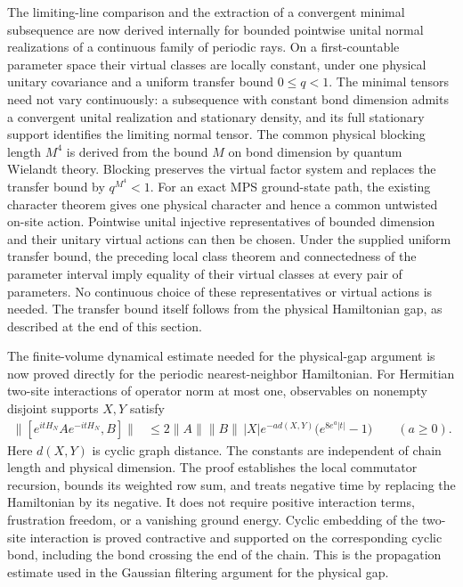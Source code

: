 \documentclass{article}
\begin{document}
The limiting-line comparison and the extraction of a convergent minimal
subsequence are now derived internally for bounded pointwise unital normal
realizations of a continuous family of periodic rays. On a first-countable
parameter space their virtual classes are locally constant, under one
physical unitary covariance and a uniform transfer bound $0\leq q<1$.
The minimal tensors need not vary continuously: a subsequence with constant
bond dimension admits a convergent unital realization and stationary density,
and its full stationary support identifies the limiting normal tensor.
The common physical blocking length $M^4$ is derived from the bound $M$ on
bond dimension by quantum Wielandt theory. Blocking preserves the virtual
factor system and replaces the transfer bound by $q^{M^4}<1$.
For an exact MPS ground-state path, the existing character theorem gives
one physical character and hence a common untwisted on-site action. Pointwise
unital injective representatives of bounded dimension and their unitary
virtual actions can then be chosen. Under the supplied uniform transfer
bound, the preceding local class theorem and connectedness of the parameter
interval imply equality of their virtual classes at every pair of parameters.
No continuous choice of these representatives or virtual actions is needed.
The transfer bound itself follows from the physical Hamiltonian gap, as
described at the end of this section.

The finite-volume dynamical estimate needed for the physical-gap argument
is now proved directly for the periodic nearest-neighbor Hamiltonian.
For Hermitian two-site interactions of operator norm at most one,
observables on nonempty disjoint supports $X,Y$ satisfy
\begin{align}
    \|[e^{itH_N}Ae^{-itH_N},B]\|
     & \leq 2\|A\|\|B\|\,|X|e^{-a d(X,Y)}
    \bigl(e^{8e^a|t|}-1\bigr)
    \qquad(a\geq0).
    \label{eq:spc11_spt_interpolation_upper_range_lieb_robinson}
\end{align}
Here $d(X,Y)$ is cyclic graph distance. The constants are independent of
chain length and physical dimension. The proof establishes the local
commutator recursion, bounds its weighted row sum, and treats negative time
by replacing the Hamiltonian by its negative. It does not require positive
interaction terms, frustration freedom, or a vanishing ground energy.
Cyclic embedding of the two-site interaction is proved contractive and
supported on the corresponding cyclic bond, including the bond crossing
the end of the chain. This is the propagation estimate used in the Gaussian filtering argument
for the physical gap.
\end{document}
